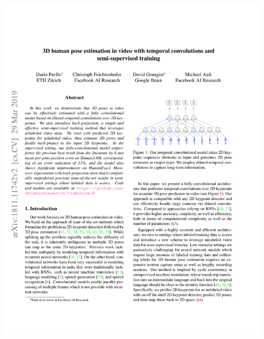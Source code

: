 
\centering
\includegraphics[width=\textwidth, page=1, trim=28mm 30mm 28mm 32.5mm]{appendix/videopose3d.pdf}

